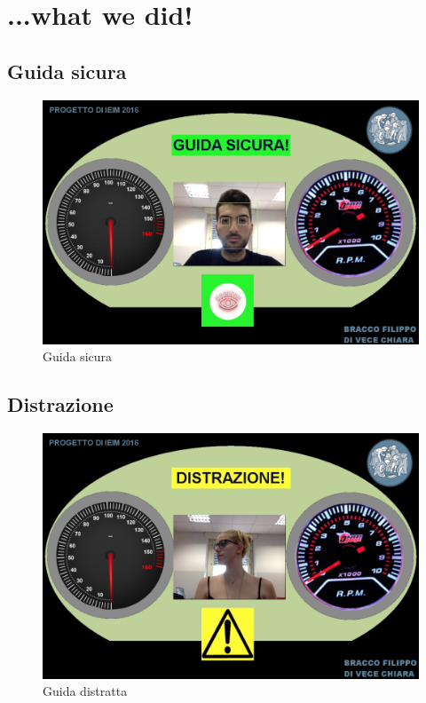 \documentclass[12pt]{article}
\begin{document}
		
	\section{...what we did!}	
	
	\subsection{Guida sicura}
	
		\begin{figure}[H]
			\centering
			\includegraphics[width=0.8\linewidth]{../Assets/Img/guida_sicura_tex.png}
			\caption{Guida sicura}
			\label{fig:guidasicura}
		\end{figure}

		
	\subsection{Distrazione}
	
		\begin{figure}[H]
			\centering
			\includegraphics[width=0.8\linewidth]{../Assets/Img/guida_distratta_tex.png}
			\caption{Guida distratta}
			\label{fig:guidadistratta}
		\end{figure}
\end{document}

